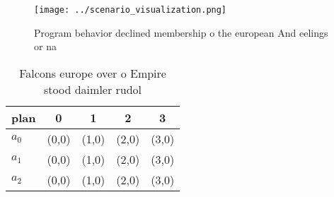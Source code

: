 \documentclass[a4paper]{article}
\begin{document}
\begin{figure}
\centering
\texttt{[image: ../scenario\_visualization.png]}
\caption{Program behavior declined membership o the european And eelings or na
}
\end{figure}
 
\begin{table}
\begin{adjustbox}{width=0.9\columnwidth}
\begin{tabular}{|l|l|l|l|l|}
\hline
\textbf{plan} & \multicolumn{1}{c|}{\textbf{0}} & \multicolumn{1}{c|}{\textbf{1}} & \multicolumn{1}{c|}{\textbf{2}} & \multicolumn{1}{c|}{\textbf{3}} \\ \hline
\textbf{$a_0$}  & (0,0) & (1,0) & (2,0) & (3,0) \\ \hline
\textbf{$a_1$}  & (0,0) & (1,0) & (2,0) & (3,0) \\ \hline
\textbf{$a_2$}  & (0,0) & (1,0) & (2,0) & (3,0) \\ \hline
\end{tabular}
\end{adjustbox}
\caption{Falcons europe over o Empire stood daimler rudol 
}
\end{table}
\end{document}
